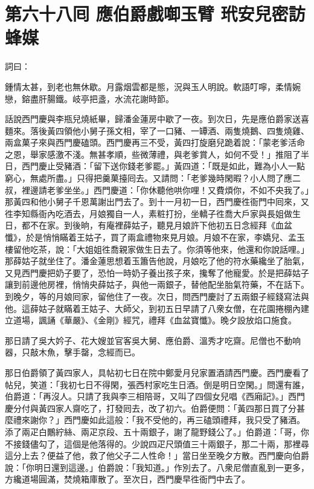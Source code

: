 
\chapter*{第六十八囘 應伯爵戲啣玉臂 玳安兒密訪蜂媒}


詞曰：

\begin{myquote} 
鍾情太甚，到老也無休歇。月露烟雲都是態，況與玉人明說。軟語叮嚀，柔情婉戀，鎔盡肝腸鐵。岐亭把盞，水流花謝時節。

\end{myquote} 

話說西門慶與李瓶兒燒紙畢，歸潘金蓮房中歇了一夜。到次日，先是應伯爵家送喜麵來。落後黃四領他小舅子孫文相，宰了一口豬、一罈酒、兩隻燒鵝、四隻燒雞、兩盒菓子來與西門慶磕頭。西門慶再三不受，黃四打旋磨兒跪着說：「蒙老爹活命之恩，舉家感激不淺。無甚孝順，些微薄禮，與老爹賞人，如何不受！」推阻了半日，西門慶止受豬酒：「留下送你錢老爹罷。」黃四道：「既是如此，難為小人一點窮心，無處所盡。」只得把羹菓擡囘去。又請問：「老爹幾時閑暇？小人問了應二叔，裡邊請老爹坐坐。」西門慶道：「你休聽他哄你哩！又費煩你，不如不央我了。」那黃四和他小舅子千恩萬謝出門去了。到十一月初一日，西門慶徃衙門中囘來，又徃李知縣衙內吃酒去，月娘獨自一人，素粧打扮，坐轎子徃喬大戶家與長姐做生日，都不在家。到後晌，有庵裡薛姑子，聽見月娘許下他初五日念經拜《血盆懺》，於是悄悄瞞着王姑子，買了兩盒禮物來見月娘。月娘不在家，李嬌兒、孟玉樓留他吃茶，說：「大姐姐徃喬親家做生日去了。你須等他來，他還和你說話哩。」那薛姑子就坐住了。潘金蓮思想着玉簫告他說，月娘吃了他的符水藥纔坐了胎氣，又見西門慶把奶子要了，恐怕一時奶子養出孩子來，攙奪了他寵愛。於是把薛姑子讓到前邊他房裡，悄悄央薛姑子，與他一兩銀子，替他配坐胎氣符藥，不在話下。到晚夕，等的月娘囘家，留他住了一夜。次日，問西門慶討了五兩銀子經錢寫法與他。這薛姑子就瞞着王姑子、大師父，到初五日早請了八衆女僧，在花園捲棚內建立道場，諷誦《華嚴》、《金剛》經咒，禮拜《血盆寶懺》。晚夕設放焰口施食。

那日請了吳大妗子、花大嫂並官客吳大舅、應伯爵、溫秀才吃齋。尼僧也不動响器，只敲木魚，擊手罄，念經而已。

那日伯爵領了黃四家人，具帖初七日在院中鄭愛月兒家置酒請西門慶。西門慶看了帖兒，笑道：「我初七日不得閑，張西村家吃生日酒。倒是明日空閑。」{}問還有誰，伯爵道：「再沒人。只請了我與李三相陪哥，又叫了四個女兒唱《西廂記》。」西門慶分付與黃四家人齋吃了，打發囘去，改了初六。伯爵便問：「黃四那日買了分甚麼禮來謝你？」西門慶如此這般：「我不受他的，再三磕頭禮拜，我只受了豬酒。添了兩疋白鷳紵絲、兩疋京段、五十兩銀子，謝了龍野錢公了。」伯爵道：「哥，你不接錢儘勾了，這個是他落得的。少說四疋尺頭值三十兩銀子，那二十兩，那裡尋這分上去？便益了他，救了他父子二人性命！」當日坐至晚夕方散。西門慶向伯爵說：「你明日還到這邊。」伯爵說：「我知道。」作別去了。八衆尼僧直亂到一更多，方纔道場圓滿，焚燒箱庫散了。至次日，西門慶早徃衙門中去了。

